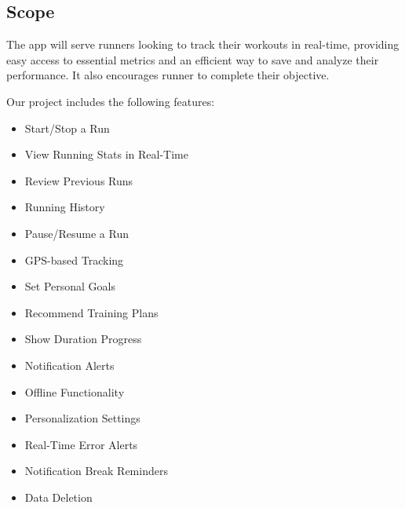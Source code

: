 \documentclass{article}
\begin{document}
\subsection{Scope}
    The app will serve runners looking to track their workouts in real-time, providing easy access to essential metrics and an efficient way to save and analyze their performance. It also encourages runner to complete their objective.
    
    Our project includes the following features:
\begin{itemize}
    \item Start/Stop a Run
    \item View Running Stats in Real-Time
    \item Review Previous Runs
    \item Running History
    \item Pause/Resume a Run
    \item GPS-based Tracking
    \item Set Personal Goals
    \item Recommend Training Plans
    \item Show Duration Progress
    \item Notification Alerts
    \item Offline Functionality
    \item Personalization Settings
    \item Real-Time Error Alerts
    \item Notification Break Reminders
    \item Data Deletion
\end{itemize}
\end{document}
